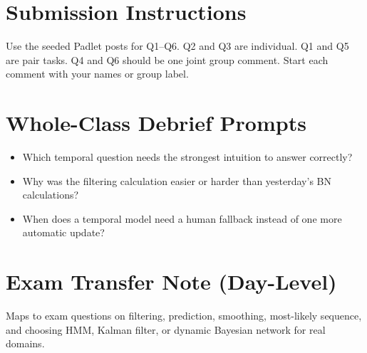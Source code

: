 \documentclass[11pt]{article}
\providecommand{\tightlist}{\setlength{\itemsep}{0pt}\setlength{\parskip}{0pt}}
\begin{document}
\section*{Submission Instructions}

Use the seeded Padlet posts for Q1--Q6. Q2 and Q3 are individual. Q1 and Q5 are pair tasks. Q4 and Q6 should be one joint group comment. Start each comment with your names or group label.

\section*{Whole-Class Debrief Prompts}

\begin{itemize}
\tightlist
\item
  Which temporal question needs the strongest intuition to answer correctly?
\item
  Why was the filtering calculation easier or harder than yesterday's BN calculations?
\item
  When does a temporal model need a human fallback instead of one more automatic update?
\end{itemize}

\section*{Exam Transfer Note (Day-Level)}

Maps to exam questions on filtering, prediction, smoothing, most-likely sequence, and choosing HMM, Kalman filter, or dynamic Bayesian network for real domains.
\end{document}
